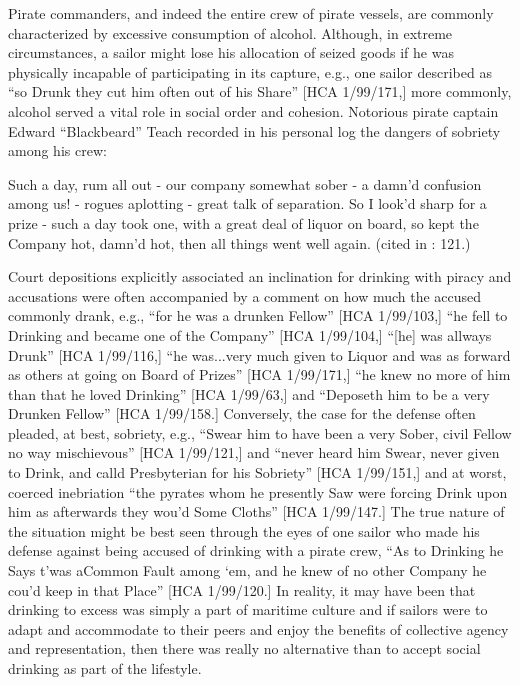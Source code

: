 Pirate commanders, and indeed the entire crew of pirate vessels, are commonly characterized by excessive consumption of alcohol. Although, in extreme circumstances, a sailor might lose his allocation of seized goods if he was physically incapable of participating in its capture, e.g., one sailor described as “so Drunk they cut him often out of his Share” [HCA 1/99/171,] more commonly, alcohol served a vital role in social order and cohesion. Notorious pirate captain Edward “Blackbeard” Teach recorded in his personal log the dangers of sobriety among his crew:

Such a day, rum all out - our company somewhat sober - a damn’d confusion among us! - rogues aplotting - great talk of separation. So I look’d sharp for a prize - such a day took one, with a great deal of liquor on board, so kept the Company hot, damn’d hot, then all things went well again. (cited in \citealt{Bicheno2012}: 121.) 

Court depositions explicitly associated an inclination for drinking with piracy and accusations were often accompanied by a comment on how much the accused commonly drank, e.g., “for he was a drunken Fellow” [HCA 1/99/103,] “he fell to Drinking and became one of the Company” [HCA 1/99/104,] “[he] was allways Drunk” [HCA 1/99/116,] “he was...very much given to Liquor and was as forward as others at going on Board of Prizes” [HCA 1/99/171,] “he knew no more of him than that he loved Drinking” [HCA 1/99/63,] and “Deposeth him to be a very Drunken Fellow” [HCA 1/99/158.] Conversely, the case for the defense often pleaded, at best, sobriety, e.g., “Swear him to have been a very Sober, civil Fellow no way mischievous” [HCA 1/99/121,] and “never heard him Swear, never given to Drink, and calld Presbyterian for his Sobriety” [HCA 1/99/151,] and at worst, coerced inebriation “the pyrates whom he presently Saw were forcing Drink upon him as afterwards they wou’d Some Cloths” [HCA 1/99/147.] The true nature of the situation might be best seen through the eyes of one sailor who made his defense against being accused of drinking with a pirate crew, “As to Drinking he Says t’was aCommon Fault among ‘em, and he knew of no other Company he cou’d keep in that Place” [HCA 1/99/120.] In reality, it may have been that drinking to excess was simply a part of maritime culture and if sailors were to adapt and accommodate to their peers and enjoy the benefits of collective agency and representation, then there was really no alternative than to accept social drinking as part of the lifestyle.  

